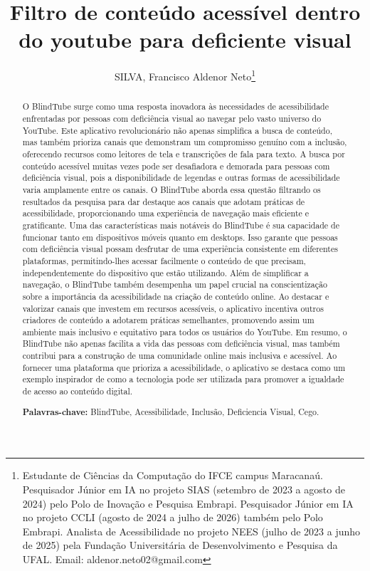\documentclass[12pt]{article}
\title{Filtro de conteúdo acessível dentro do youtube para deficiente visual}
\author{SILVA, Francisco Aldenor Neto\thanks{Estudante de Ciências da Computação do IFCE campus Maracanaú. Pesquisador Júnior em IA no projeto SIAS (setembro de 2023 a agosto de 2024) pelo Polo de Inovação e Pesquisa Embrapi. Pesquisador Júnior em IA no projeto CCLI (agosto de 2024 a julho de 2026) também pelo Polo Embrapi. Analista de Acessibilidade no projeto NEES (julho de 2023 a junho de 2025) pela Fundação Universitária de Desenvolvimento e Pesquisa da UFAL. Email: aldenor.neto02@gmail.com}}
\date{\vspace{-5ex}}
\begin{document}
\maketitle

\begin{abstract}
\onehalfspacing
O BlindTube surge como uma resposta inovadora às necessidades de acessibilidade enfrentadas por pessoas com deficiência visual ao navegar pelo vasto universo do YouTube. Este aplicativo revolucionário não apenas simplifica a busca de conteúdo, mas também prioriza canais que demonstram um compromisso genuíno com a inclusão, oferecendo recursos como leitores de tela e transcrições de fala para texto.
A busca por conteúdo acessível muitas vezes pode ser desafiadora e demorada para pessoas com deficiência visual, pois a disponibilidade de legendas e outras formas de acessibilidade varia amplamente entre os canais. O BlindTube aborda essa questão filtrando os resultados da pesquisa para dar destaque aos canais que adotam práticas de acessibilidade, proporcionando uma experiência de navegação mais eficiente e gratificante.
Uma das características mais notáveis do BlindTube é sua capacidade de funcionar tanto em dispositivos móveis quanto em desktops. Isso garante que pessoas com deficiência visual possam desfrutar de uma experiência consistente em diferentes plataformas, permitindo-lhes acessar facilmente o conteúdo de que precisam, independentemente do dispositivo que estão utilizando.
Além de simplificar a navegação, o BlindTube também desempenha um papel crucial na conscientização sobre a importância da acessibilidade na criação de conteúdo online. Ao destacar e valorizar canais que investem em recursos acessíveis, o aplicativo incentiva outros criadores de conteúdo a adotarem práticas semelhantes, promovendo assim um ambiente mais inclusivo e equitativo para todos os usuários do YouTube.
Em resumo, o BlindTube não apenas facilita a vida das pessoas com deficiência visual, mas também contribui para a construção de uma comunidade online mais inclusiva e acessível. Ao fornecer uma plataforma que prioriza a acessibilidade, o aplicativo se destaca como um exemplo inspirador de como a tecnologia pode ser utilizada para promover a igualdade de acesso ao conteúdo digital.

\textbf{Palavras-chave:} BlindTube, Acessibilidade, Inclusão, Deficiencia Visual, Cego.
\end{abstract}
\end{document}
